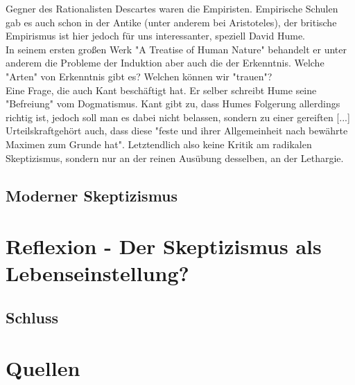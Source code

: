 \documentclass[12pt,a4paper]{article}
\begin{document}
Gegner des Rationalisten Descartes waren die Empiristen. Empirische Schulen gab es auch schon in der Antike (unter anderem bei Aristoteles), der britische Empirismus ist hier jedoch für uns interessanter, speziell David Hume.\\
 In seinem ersten großen Werk "A Treatise of Human Nature" behandelt er unter anderem die Probleme der Induktion aber auch die der Erkenntnis. Welche "Arten" von Erkenntnis gibt es? Welchen können wir "trauen"?\\

Eine Frage, die auch Kant beschäftigt hat. Er selber schreibt Hume seine "Befreiung" vom Dogmatismus. Kant gibt zu, dass Humes Folgerung allerdings richtig ist, jedoch soll man es dabei nicht belassen, sondern zu einer  \glqq gereiften [...] Urteilskraft\grqq gehört auch, dass diese "feste und ihrer Allgemeinheit nach bewährte Maximen zum Grunde hat".%
Letztendlich also keine Kritik am radikalen Skeptizismus, sondern nur an der reinen Ausübung desselben, an der Lethargie.\\
	\subsection{Moderner Skeptizismus}
\section{Reflexion - Der Skeptizismus als Lebenseinstellung?}
	\subsection{Schluss}


\section*{Quellen}
\end{document}
